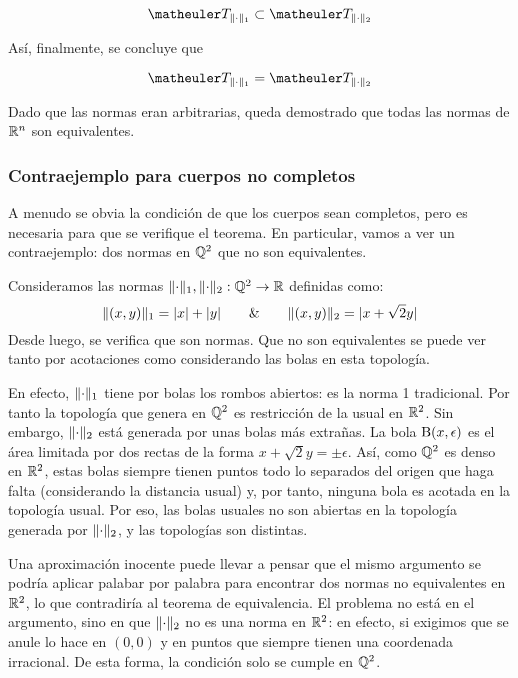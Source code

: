 \begin{equation*}
\T_{\norm{\cdot}_1}\subset\T_{\norm{\cdot}_2}
\end{equation*}

Así, finalmente, se concluye que

\begin{equation}
\T_{\norm{\cdot}_1}=\T_{\norm{\cdot}_2}
\end{equation}

Dado que las normas eran arbitrarias, queda demostrado que todas las normas de $\mathbb{R}^n$ son equivalentes.

\subsubsection{Contraejemplo para cuerpos no completos}

A menudo se obvia la condición de que los cuerpos sean completos, pero es necesaria para que se verifique el teorema. En particular, vamos a ver un contraejemplo: dos normas en $\mathbb{Q}^2$ que no son equivalentes.

Consideramos las normas $\lVert\cdot\rVert_1,\lVert\cdot\rVert_2:\mathbb{Q}^2\to\mathbb{R}$ definidas como:
\[\lVert(x,y)\rVert_1 = \lvert x\rvert+\lvert y\rvert\quad\quad\&\quad\quad \lVert(x,y)\rVert_2 = \lvert x+\sqrt{2}y\rvert\]
Desde luego, se verifica que son normas. Que no son equivalentes se puede ver tanto por acotaciones como considerando las bolas en esta topología.

En efecto, $\lVert\cdot\rVert_1$ tiene por bolas los rombos abiertos: es la norma 1 tradicional. Por tanto la topología que genera en $\mathbb{Q}^2$ es restricción de la usual en $\mathbb{R}^2$. Sin embargo, $\lVert\cdot\rVert_2$ está generada por unas bolas más extrañas. La bola $\operatorname{B}(x,\epsilon)$ es el área limitada por dos rectas de la forma $x+\sqrt{2}y=\pm\epsilon$. Así, como $\mathbb{Q}^2$ es denso en $\mathbb{R}^2$, estas bolas siempre tienen puntos todo lo separados del origen que haga falta (considerando la distancia usual) y, por tanto, ninguna bola es acotada en la topología usual. Por eso, las bolas usuales no son abiertas en la topología generada por $\lVert\cdot\rVert_2$, y las topologías son distintas.

Una aproximación inocente puede llevar a pensar que el mismo argumento se podría aplicar palabar por palabra para encontrar dos normas no equivalentes en $\mathbb{R}^2$, lo que contradiría al teorema de equivalencia. El problema no está en el argumento, sino en que $\lVert\cdot\rVert_2$ no es una norma en $\mathbb{R}^2$: en efecto, si exigimos que se anule lo hace en $(0,0)$ y en puntos que siempre tienen una coordenada irracional. De esta forma, la condición solo se cumple en $\mathbb{Q}^2$. 